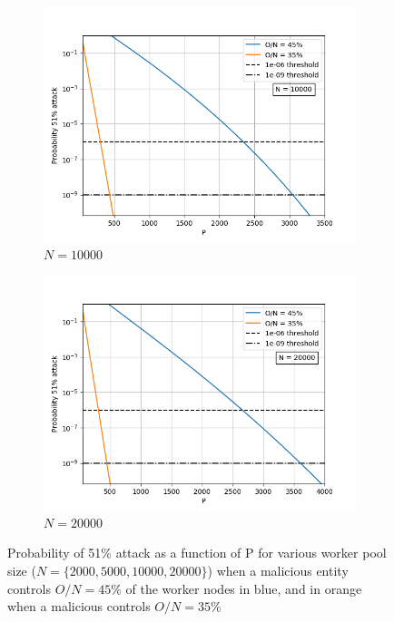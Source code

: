 \begin{figure}[H]
        \begin{subfigure}[b]{0.45\textwidth}
        \includegraphics[width=\textwidth]{Figures/Prob51_vs_P_N10000_O35_to_45}  
       \renewcommand{\thesubfigure}{c}
        \caption{$N = 10000$}
        \label{fig:N10000}
    \end{subfigure}
        \begin{subfigure}[b]{0.45\textwidth}
        \includegraphics[width=\textwidth]{Figures/Prob51_vs_P_N20000_O35_to_45}
        \renewcommand{\thesubfigure}{d}
        \caption{$N = 20000$}
        \label{fig:N=20000}
    \end{subfigure}
\caption{Probability of 51\% attack as a function of P for various worker pool size ($N=\{2000, 5000, 10000, 20000\}$) when a malicious entity controls $O/N = 45\%$ of the worker nodes in blue, and in orange when a malicious controls $O/N = 35\%$}\label{fig:P}
\end{figure}    

